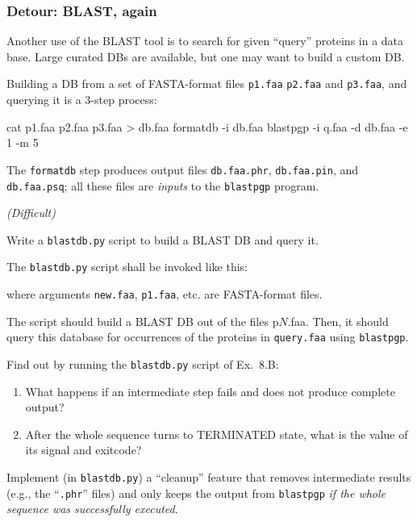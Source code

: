 \documentclass[english,serif,mathserif,xcolor=pdftex,dvipsnames,table]{beamer}
\begin{document}
\begin{frame}[fragile]
  \frametitle{Detour: BLAST, again}

  Another use of the BLAST tool is to search for given ``query''
  proteins in a data base.  Large curated DBs are available, but one
  may want to build a custom DB.

  \+
  Building a DB from a set of FASTA-format files \texttt{p1.faa}
  \texttt{p2.faa} and \texttt{p3.faa}, and querying it is a 3-step
  process:
\begin{sh}
  cat p1.faa p2.faa p3.faa > db.faa
  formatdb -i db.faa
  blastpgp -i q.faa -d db.faa -e 1 -m 5
\end{sh}

  \+ The \texttt{formatdb} step produces output files
  \texttt{db.faa.phr}, \texttt{db.faa.pin}, and \texttt{db.faa.psq}; all
  these files are \emph{inputs} to the \texttt{blastpgp} program.
\end{frame}


\begin{frame}[fragile]
  \begin{exercise*}[8.B] \emph{(Difficult)}

    Write a \texttt{blastdb.py} script to build a BLAST DB and query it.

    \+
    The \texttt{blastdb.py} script shall be invoked like this:
    where arguments \texttt{new.faa}, \texttt{p1.faa}, etc. are FASTA-format files.

    \+
    The script should build a BLAST DB out of the files {p$N$.faa}.
    Then, it should query this database for occurrences of the
    proteins in \texttt{query.faa} using \texttt{blastpgp}.
  \end{exercise*}
\end{frame}


\begin{frame}
  \begin{exercise*}[8.C]
    Find out by running the \texttt{blastdb.py} script of Ex.~8.B:

    \+
    \begin{enumerate}
    \item What happens if an intermediate step fails and does not
      produce complete output?

      \+
    \item After the whole sequence turns to TERMINATED state, what is
      the value of its signal and exitcode?
    \end{enumerate}
  \end{exercise*}

  \+
  \begin{exercise*}[8.D]
    Implement (in \texttt{blastdb.py}) a ``cleanup'' feature that removes
    intermediate results (e.g., the ``\texttt{.phr}'' files) and only keeps the
    output from \texttt{blastpgp} \emph{if the whole sequence was successfully
      executed}.
  \end{exercise*}
\end{frame}
\end{document}
